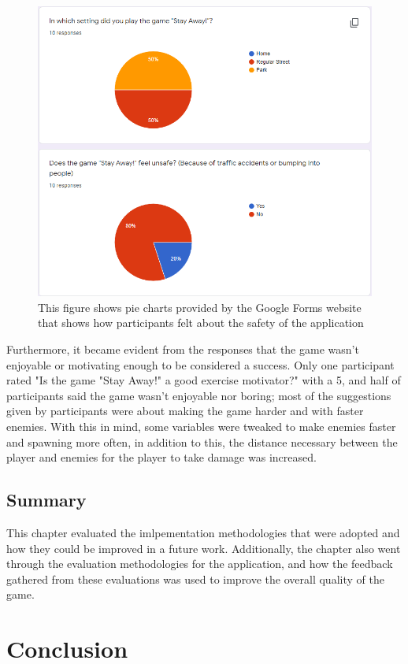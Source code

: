 \documentclass{dissertation}
\begin{document}
\begin{figure}[H]
\centering
\includegraphics[width = 12cm]{images/unsafe-chart.png}
\caption{This figure shows pie charts provided by the Google Forms website that shows how participants felt about the safety of the application}
\label{fig:unsafe-chart}
\end{figure}

Furthermore, it became evident from the responses that the game wasn't enjoyable or motivating enough to be considered a success. Only one participant rated "Is the game "Stay Away!" a good exercise motivator?" with a 5, and half of participants said the game wasn't enjoyable nor boring; most of the suggestions given by participants were about making the game harder and with faster enemies. With this in mind, some variables were tweaked to make enemies faster and spawning more often, in addition to this, the distance necessary between the player and enemies for the player to take damage was increased.

\section{Summary}
This chapter evaluated the imlpementation methodologies that were adopted and how they could be improved in a future work. Additionally, the chapter also went through the evaluation methodologies for the application, and how the feedback gathered from these evaluations was used to improve the overall quality of the game.

\chapter{Conclusion}
\end{document}
